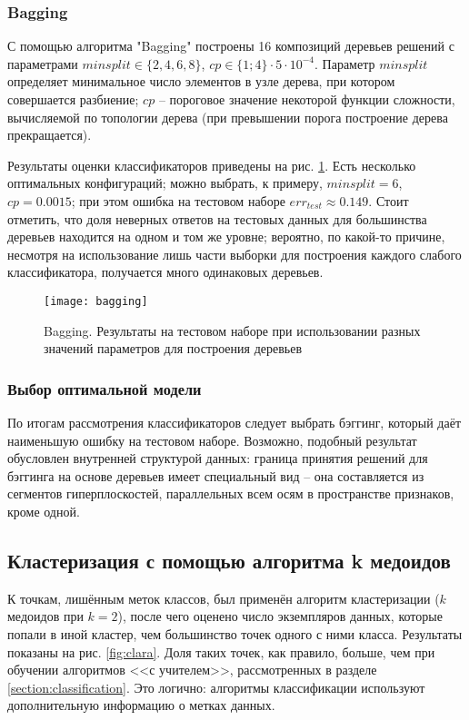 \documentclass[a4paper,12pt]{article} %
\begin{document}
\subsubsection{Bagging}

С помощью алгоритма "Bagging"\hspace{0pt} построены 16 композиций деревьев решений с параметрами $ minsplit \in \{2, 4, 6, 8\} $, $cp \in \{1;4\} \cdot 5 \cdot 10^{-4}$. Параметр $ minsplit $ определяет минимальное число элементов в узле дерева, при котором совершается разбиение; $ cp $ -- пороговое значение некоторой функции сложности, вычисляемой по топологии дерева (при превышении порога построение дерева прекращается).

Результаты оценки классификаторов приведены на рис. \ref{fig:bagging}.
Есть несколько оптимальных конфигураций; можно выбрать, к примеру, $ minsplit = 6 $, $ cp = 0.0015 $; при этом ошибка на тестовом наборе $ err_{test} \approx 0.149 $.
Стоит отметить, что доля неверных ответов на тестовых данных для большинства деревьев находится на одном и том же уровне;
вероятно, по какой-то причине, несмотря на использование лишь части выборки для построения каждого слабого классификатора, получается много одинаковых деревьев.

\begin{figure}[H]
    \centering \texttt{[image: bagging]}
    \caption{Bagging.
        Результаты на тестовом наборе при использовании разных значений параметров для построения деревьев}
    \label{fig:bagging}
\end{figure}

\subsubsection{Выбор оптимальной модели}

По итогам рассмотрения классификаторов следует выбрать бэггинг, который даёт наименьшую ошибку на тестовом наборе.
Возможно, подобный результат обусловлен внутренней структурой данных: граница принятия решений для бэггинга на основе деревьев имеет специальный вид -- она составляется из сегментов гиперплоскостей, параллельных всем осям в пространстве признаков, кроме одной.

\subsection{Кластеризация с помощью алгоритма k медоидов}

К точкам, лишённым меток классов, был применён алгоритм кластеризации ($ k $ медоидов при $ k = 2 $), после чего оценено число экземпляров данных, которые попали в иной кластер, чем большинство точек одного с ними класса.
Результаты показаны на рис.  \ref{fig:clara}.
Доля таких точек, как правило, больше, чем при обучении алгоритмов <<с учителем>>, рассмотренных в разделе \ref{section:classification}.
Это логично: алгоритмы классификации используют дополнительную информацию о метках данных.
\end{document}
